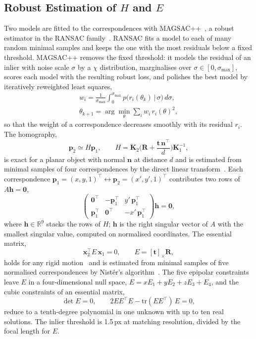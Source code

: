 \documentclass[journal]{IEEEtran}
\newcommand{\R}{\mathbf{R}}
\newcommand{\tv}{\mathbf{t}}
\newcommand{\K}{\mathbf{K}}
\newcommand{\x}{\mathbf{x}}
\newcommand{\n}{\mathbf{n}}
\begin{document}
\subsection{Robust Estimation of $H$ and $E$}
Two models are fitted to the correspondences with MAGSAC++~\cite{magsac}, a robust estimator in the RANSAC family~\cite{ransac}. RANSAC fits a model to each of many random minimal samples and keeps the one with the most residuals below a fixed threshold. MAGSAC++ removes the fixed threshold: it models the residual of an inlier with noise scale $\sigma$ by a $\chi$ distribution, marginalises over $\sigma\in[0,\sigma_{\max}]$, scores each model with the resulting robust loss, and polishes the best model by iteratively reweighted least squares,
\begin{gather}
  w_i=\frac{1}{\sigma_{\max}}\int_0^{\sigma_{\max}} p\big(r_i(\theta_k)\,\big|\,\sigma\big)\,d\sigma,\\
  \theta_{k+1}=\arg\min_\theta\sum_i w_i\,r_i(\theta)^2 ,
\end{gather}
so that the weight of a correspondence decreases smoothly with its residual $r_i$. The homography,
\begin{equation}
  \mathbf{p}_2 \simeq H\mathbf{p}_1,\qquad H = \K_2\Big(\R + \frac{\tv\,\n^\top}{d}\Big)\K_1^{-1},
\end{equation}
is exact for a planar object with normal $\n$ at distance $d$ and is estimated from minimal samples of four correspondences by the direct linear transform~\cite{hz}. Each correspondence $\mathbf{p}_1=(x,y,1)^\top\leftrightarrow\mathbf{p}_2=(x',y',1)^\top$ contributes two rows of $A\mathbf{h}=\mathbf{0}$,
\begin{equation}
  \begin{pmatrix} \mathbf{0}^\top & -\mathbf{p}_1^\top & y'\,\mathbf{p}_1^\top\\ \mathbf{p}_1^\top & \mathbf{0}^\top & -x'\,\mathbf{p}_1^\top\end{pmatrix}\mathbf{h}=\mathbf{0},
\end{equation}
where $\mathbf{h}\in\mathbb{R}^9$ stacks the rows of $H$; $\mathbf{h}$ is the right singular vector of $A$ with the smallest singular value, computed on normalised coordinates. The essential matrix,
\begin{equation}
  \x_2^\top E\,\x_1 = 0,\qquad E = [\tv]_\times\R,
\end{equation}
holds for any rigid motion~\cite{longuethiggins} and is estimated from minimal samples of five normalised correspondences by Nist\'er's algorithm~\cite{nister}. The five epipolar constraints leave $E$ in a four-dimensional null space, $E=xE_1+yE_2+zE_3+E_4$, and the cubic constraints of an essential matrix,
\begin{equation}
  \det E = 0,\qquad 2EE^\top E-\mathrm{tr}(EE^\top)\,E=0,
\end{equation}
reduce to a tenth-degree polynomial in one unknown with up to ten real solutions. The inlier threshold is 1.5\,px at matching resolution, divided by the focal length for $E$.
\end{document}

